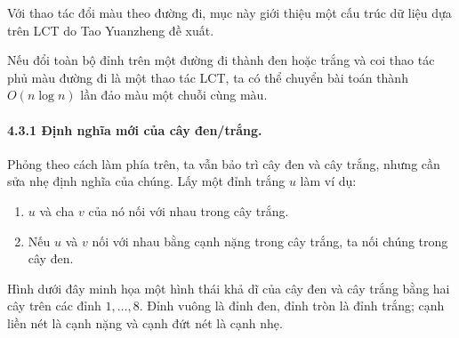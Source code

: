 \documentclass[11pt]{article}
\begin{document}
Với thao tác đổi màu theo đường đi, mục này giới thiệu một cấu trúc dữ liệu dựa
trên LCT do Tao Yuanzheng đề xuất.

Nếu đổi toàn bộ đỉnh trên một đường đi thành đen hoặc trắng và coi thao tác phủ
màu đường đi là một thao tác LCT, ta có thể chuyển bài toán thành
\(O(n\log n)\) lần đảo màu một chuỗi cùng màu.

\paragraph{4.3.1 Định nghĩa mới của cây đen/trắng.}
Phỏng theo cách làm phía trên, ta vẫn bảo trì cây đen và cây trắng, nhưng cần
sửa nhẹ định nghĩa của chúng. Lấy một đỉnh trắng \(u\) làm ví dụ:
\begin{enumerate}
  \item \(u\) và cha \(v\) của nó nối với nhau trong cây trắng.
  \item Nếu \(u\) và \(v\) nối với nhau bằng cạnh nặng trong cây trắng, ta nối
  chúng trong cây đen.
\end{enumerate}

Hình dưới đây minh họa một hình thái khả dĩ của cây đen và cây trắng bằng hai
cây trên các đỉnh \(1,\ldots,8\). Đỉnh vuông là đỉnh đen, đỉnh tròn là đỉnh
trắng; cạnh liền nét là cạnh nặng và cạnh đứt nét là cạnh nhẹ.
\end{document}
